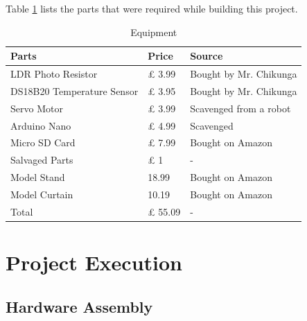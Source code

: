 \documentclass[a4paper,12pt]{article}
\begin{document}
Table \ref{tab:equipment} lists the parts that were required while building this project.

\begin{table}[h!]
    \caption{Equipment}
    \begin{tabular}{l | l | l}
        Parts & Price & Source \\
        \hline
        LDR Photo Resistor & £ 3.99 & Bought by Mr. Chikunga \\
        DS18B20 Temperature Sensor & £ 3.95 & Bought by Mr. Chikunga \\
        Servo Motor & £ 3.99 & Scavenged from a robot \\
        Arduino Nano & £ 4.99 & Scavenged \\
        Micro SD Card & £ 7.99 & Bought on Amazon \\
        Salvaged Parts & £ 1 & - \\
        Model Stand & 18.99 & Bought on Amazon \\
        Model Curtain & 10.19 & Bought on Amazon \\
        Total & £ 55.09 & - \\
    \end{tabular}
    \label{tab:equipment}
\end{table}

\section{Project Execution}

\subsection{Hardware Assembly}
\end{document}
